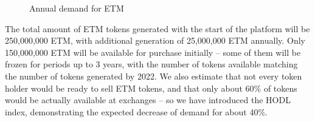 \documentclass[12pt]{report}
\begin{document}
\begin{figure}[H]
\centering
\caption{Annual demand for ETM}
\vspace{20pt}
\demandUSD
{}
\end{figure}

The total amount of ETM tokens generated with the start of the platform will be 250,000,000 ETM, with additional generation of 25,000,000 ETM annually. Only 150,000,000 ETM will be available for purchase initially – some of them will be frozen for periods up to 3 years, with the number of tokens available matching the number of tokens generated by 2022. We also estimate that not every token holder would be ready to sell ETM tokens, and that only about 60\% of tokens would be actually available at exchanges – so we have introduced the HODL index, demonstrating the expected decrease of demand for about 40\%.
\end{document}
